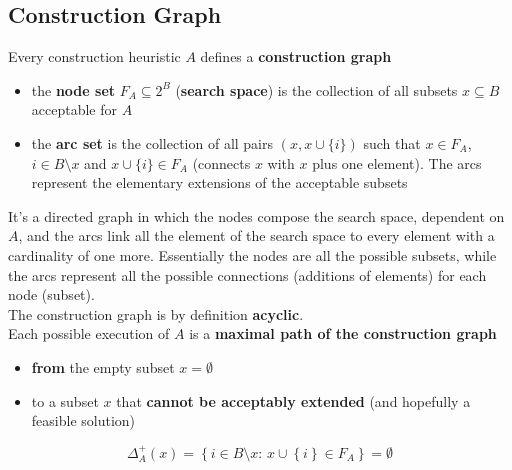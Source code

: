 \documentclass[11pt]{article}
\begin{document}
	\newpage
	
	\subsection{Construction Graph}
	Every construction heuristic $A$ defines a \textbf{construction graph}
	\begin{itemize}
		\item the \textbf{node set} $F_A \subseteq 2^B$ (\textbf{search space}) is the collection of all subsets $x \subseteq B$ acceptable for $A$
		\item the \textbf{arc set} is the collection of all pairs $(x, x \cup \{i\})$ such that $x \in F_A$, $i \in B \setminus x$ and $x \cup \{i\} \in F_A$ (connects $x$ with $x$ plus one element). The arcs represent the elementary extensions of the acceptable subsets
	\end{itemize}
	
	It's a directed graph in which the nodes compose the search space, dependent on $A$, and the arcs link all the element of the search space to every element with a cardinality of one more. Essentially the nodes are all the possible subsets, while the arcs represent all the possible connections (additions of elements) for each node (subset).\\
	
	The construction graph is by definition \textbf{acyclic}.\\
	
	Each possible execution of $A$ is a \textbf{maximal path of the construction graph}
	\begin{itemize}
		\item \textbf{from} the empty subset $x = \emptyset$
		\item to a subset $x$ that \textbf{cannot be acceptably extended} (and hopefully a feasible solution)
	\end{itemize}
	$$ \Delta^+_A (x) = \left\{i \in B \setminus x : \, x \cup \left\{i\right\} \in F_A \right\} = \emptyset $$
	
	\newpage
	
\end{document}
